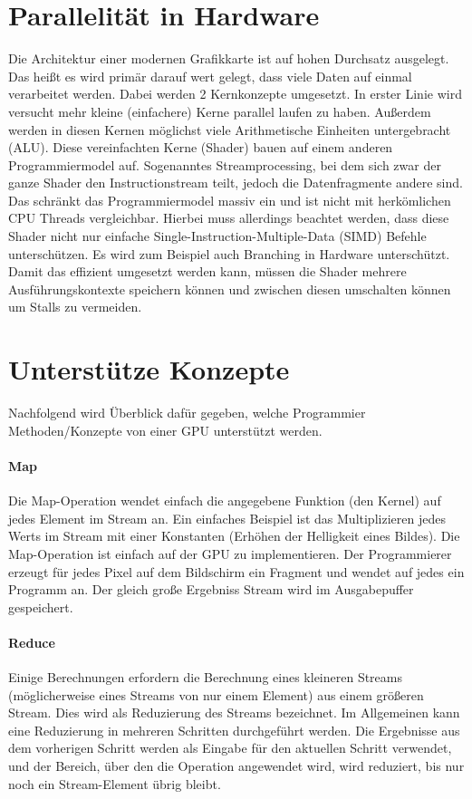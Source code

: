 \documentclass[10pt,twocolumn]{article}          %
\begin{document}
\section{Parallelit\"at in Hardware}
Die Architektur einer modernen Grafikkarte ist auf hohen Durchsatz ausgelegt. Das heißt es wird prim\"ar darauf wert gelegt, dass viele Daten auf einmal verarbeitet werden. Dabei werden 2 Kernkonzepte umgesetzt. 
In erster Linie wird versucht mehr kleine (einfachere) Kerne parallel laufen zu haben. \cite{col}
Außerdem werden in diesen Kernen m\"oglichst viele Arithmetische Einheiten untergebracht (ALU). 
Diese vereinfachten Kerne (Shader) bauen auf einem anderen Programmiermodel auf. 
Sogenanntes Streamprocessing, bei dem sich zwar der ganze Shader den Instructionstream teilt, jedoch die Datenfragmente andere sind. 
Das schr\"ankt das Programmiermodel massiv ein und ist nicht mit herk\"omlichen CPU Threads vergleichbar.
Hierbei muss allerdings beachtet werden, dass diese Shader nicht nur einfache Single-Instruction-Multiple-Data (SIMD) Befehle untersch\"utzen.
Es wird zum Beispiel auch Branching in Hardware untersch\"utzt.
Damit das effizient umgesetzt werden kann, m\"ussen die Shader mehrere Ausf\"uhrungskontexte speichern k\"onnen und zwischen diesen umschalten k\"onnen um Stalls zu vermeiden.


\section{Unterst\"utze Konzepte}
Nachfolgend wird \"Uberblick daf\"ur gegeben, welche Programmier Methoden/Konzepte von einer GPU unterst\"utzt werden.

\paragraph{Map} Die Map-Operation wendet einfach die angegebene Funktion (den Kernel) auf jedes Element im Stream an. 
Ein einfaches Beispiel ist das Multiplizieren jedes Werts im Stream mit einer Konstanten (Erh\"ohen der Helligkeit eines Bildes). 
Die Map-Operation ist einfach auf der GPU zu implementieren. 
Der Programmierer erzeugt f\"ur jedes Pixel auf dem Bildschirm ein Fragment und wendet auf jedes ein Programm an. 
Der gleich große Ergebniss Stream wird im Ausgabepuffer gespeichert. \cite{art}

\paragraph{Reduce} Einige Berechnungen erfordern die Berechnung eines kleineren Streams (m\"oglicherweise eines Streams von nur einem Element) aus einem gr\"oßeren Stream. 
Dies wird als Reduzierung des Streams bezeichnet. 
Im Allgemeinen kann eine Reduzierung in mehreren Schritten durchgef\"uhrt werden. 
Die Ergebnisse aus dem vorherigen Schritt werden als Eingabe f\"ur den aktuellen Schritt verwendet, und der Bereich, \"uber den die Operation angewendet wird, wird reduziert, bis nur noch ein Stream-Element \"ubrig bleibt.
\end{document}
